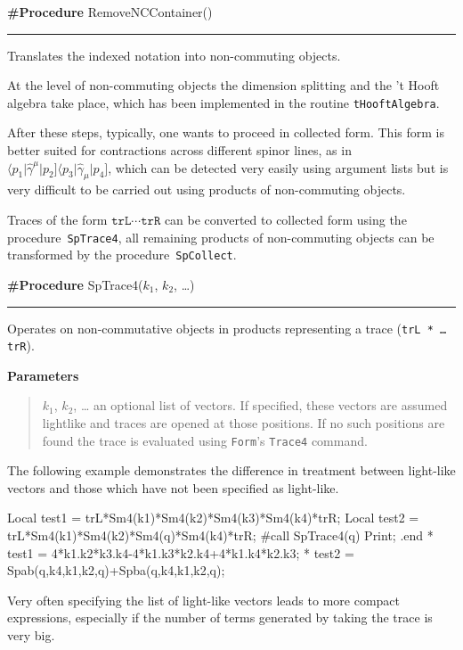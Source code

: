 \documentclass[preprint,number,12pt,sort&compress]{elsarticle}
\newcommand{\FORM}{{\texttt{Form}}}
\newcommand{\Spab}[1]{\langle #1]}
\newlength{\funcindent}
\newlength{\funcwidth}
\newenvironment{Ventry}[1]%
 {\begin{list}{}{%
   \renewcommand{\makelabel}[1]{\texttt{##1:}\hfil}%
   \settowidth{\labelwidth}{\texttt{#1:}}%
   \setlength{\leftmargin}{\labelsep}%
   \addtolength{\leftmargin}{\labelwidth}}}%
 {\end{list}}
\newenvironment{Procedure}[2]{%
\hspace{.8\funcindent}\begin{boxedminipage}{\funcwidth}
	\raggedright \textbf{\#Procedure} #1(#2)

	\vspace{-1.5ex}

	\rule{\textwidth}{0.5\fboxrule}
	\setlength{\parskip}{2ex}
}{\end{boxedminipage}}
\newenvironment{Parameters}{%
	\setlength{\parskip}{1ex}
	\textbf{Parameters}
	\vspace{-1ex}
	\begin{quote}}{%
	\end{quote}}
\begin{document}
\medskip
\begin{Procedure}{RemoveNCContainer}{}
Translates the indexed notation into non-commuting objects.
\end{Procedure}
\medskip

At the level of non-commuting objects the dimension splitting and the
't Hooft algebra take place, which has been implemented in the routine
\texttt{tHooftAlgebra}.

After these steps, typically, one wants to proceed in collected form.
This form is better suited for contractions across different spinor lines,
as in $\Spab{p_1\vert\hat{\gamma}^\mu\vert p_2}%
\Spab{p_3\vert\hat{\gamma}_\mu\vert p_4}$, which can be detected very
easily using argument lists but is very difficult to be carried out
using products of non-commuting objects.

Traces of the form
$\mathtt{trL}\cdots\mathtt{trR}$ can be converted to collected
form using the procedure~\texttt{SpTrace4}, all remaining products
of non-commuting objects can be transformed by the
procedure~\texttt{SpCollect}.

\medskip
\begin{Procedure}{SpTrace4}{$k_1$, $k_2$, \dots}
Operates on non-commutative objects in products representing
a trace (\texttt{trL * \dots * trR}).

	\begin{Parameters}
		\begin{Ventry}{$k_1$, $k_2$}
			\item[$k_1$, $k_2$, \dots] an optional list of vectors.
			If specified, these vectors are assumed lightlike and traces
			are opened at those positions. If no such positions are found
			the trace is evaluated using \FORM{}'s \texttt{Trace4} command.
		\end{Ventry}
	\end{Parameters}

\end{Procedure}
\medskip

The following example demonstrates the difference in treatment between
light-like vectors and those which have not been specified as light-like.
\begin{spform}
Local test1 = trL*Sm4(k1)*Sm4(k2)*Sm4(k3)*Sm4(k4)*trR;
Local test2 = trL*Sm4(k1)*Sm4(k2)*Sm4(q)*Sm4(k4)*trR;
#call SpTrace4(q)
Print;
.end
* test1 = 4*k1.k2*k3.k4-4*k1.k3*k2.k4+4*k1.k4*k2.k3;
* test2 = Spab(q,k4,k1,k2,q)+Spba(q,k4,k1,k2,q);
\end{spform}
Very often specifying the list of light-like vectors leads to
more compact expressions, especially if the number of terms
generated by taking the trace is very big.
\end{document}
